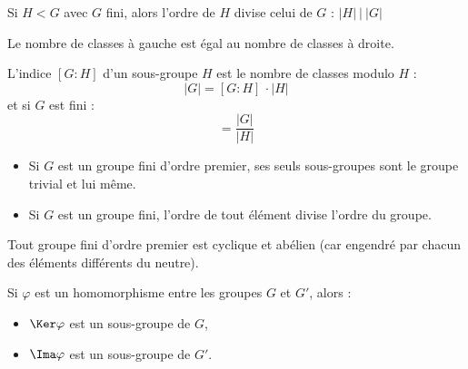 
\begin{theo}[Lagrange]

 Si $H < G$ avec $G$ fini, alors l'ordre de $H$ divise celui de $G$ :
 $ |H| \ \Big|\ |G| $
\end{theo}


\begin{coro}

 Le nombre de classes à gauche est égal au nombre de classes à droite.
\end{coro}

\begin{defi}

 L'indice $[G:H]$ d'un sous-groupe $H$ est le nombre de classes modulo $H$ :
\begin{displaymath} |G| = [G:H]\,\cdotp |H| \end{displaymath}
et si $G$ est fini :
\begin{displaymath} [G:H] = \dfrac{|G|}{|H|} \end{displaymath}
\end{defi}

\begin{coro}
\begin{itemize}
 \item Si $G$ est un groupe fini d'ordre premier, ses seuls sous-groupes sont
le groupe trivial et lui même.
 \item Si $G$ est un groupe fini, l'ordre de tout élément divise l'ordre du
groupe.
\end{itemize}
\end{coro}

\begin{example}[Remarque]
Tout groupe fini d'ordre premier est cyclique et
abélien (car engendré par chacun des éléments différents du neutre).
\end{example}

\begin{prop}
 
Si $\varphi$ est un homomorphisme entre les groupes $G$ et $G'$, alors :
\begin{itemize}
 \item $\Ker \varphi$ est un sous-groupe de $G$,
 \item $\Ima \varphi$ est un sous-groupe de $G'$.
\end{itemize}
\end{prop}


